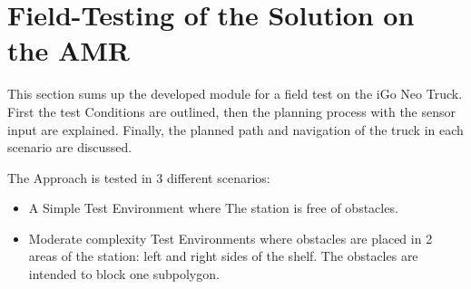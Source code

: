 \begin{table}[H]
    \centering
    \caption{Comparison of Fitness Values of the optimum paths generated by Different Algorithms in Simple and Complex Environments}

    \label{tab:fitness_values}    
\end{table}

\section{Field-Testing of the Solution on the AMR}
This section sums up the developed module for a field test on the iGo Neo Truck. 
First the test Conditions are outlined, then the planning process with the sensor input are explained.
Finally, the planned path and navigation of the truck in each scenario are discussed.

The Approach is tested in 3 different scenarios:
\begin{itemize}
    \item A Simple Test Environment where The station is free of obstacles.
    \item Moderate complexity Test Environments where  obstacles are placed in 2 areas of the station:
    left and right sides of the shelf. The obstacles are intended to block one subpolygon.
\end{itemize}

